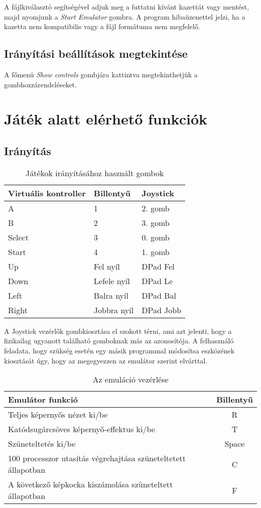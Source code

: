 A fájlkiválasztó segítségével adjuk meg a futtatni kívánt kazettát vagy mentést, majd nyomjunk a \emph{Start Emulator} gombra.
A program hibaüzenettel jelzi, ha a kazetta nem kompatibilis vagy a fájl formátuma nem megfelelő.

\subsection{Irányítási beállítások megtekintése}

A főmenü \emph{Show controls} gombjára kattintva megtekinthetjük a gombhozzárendeléseket.

\section{Játék alatt elérhető funkciók}

\subsection {Irányítás}

\begin{table}[H]
	\centering
	\begin{tabular}{ | l |  l | l | }
		\hline
		Virtuális kontroller & Billentyű & Joystick \\
		\hline			
		A & 1 & 2. gomb \\
		B & 2 & 3. gomb \\
		Select & 3 & 0. gomb \\
		Start & 4 & 1. gomb \\
		Up    & Fel nyíl & DPad Fel \\
		Down  & Lefele nyíl & DPad Le \\
		Left  & Balra nyíl & DPad Bal \\ 
		Right & Jobbra nyíl & DPad Jobb \\
		\hline
	\end{tabular}
	\caption{Játékok irányításához használt gombok}
\end{table}

A Joystick vezérlők gombkiosztása el szokott térni, ami azt jelenti, hogy a fizikailag ugyanott található gomboknak más az azonosítója. A felhasználó feladata, hogy szükség esetén egy másik programmal módosítsa eszközének kiosztását úgy, hogy az megegyezzen az emulátor szerint elvárttal.

\begin{table}[H]
	\centering
	\begin{tabular}{ | l | c | }
		\hline
		Emulátor funkció & Billentyű \\
		\hline			
		Teljes képernyős nézet ki/be & R \\
		Katódsugárcsöves képernyő-effektus ki/be & T \\
		Szüneteltetés ki/be & Space \\
		100 processzor utasítás végrehajtása szüneteltetett állapotban & C \\
		A következő képkocka kiszámolása szüneteltett állapotban & F \\
		\hline
	\end{tabular}
	\caption{Az emuláció vezérlése}
\end{table}


